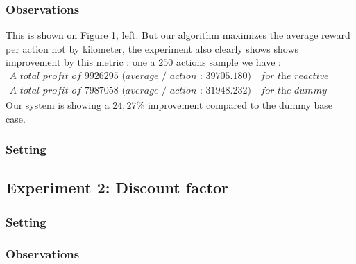 \documentclass[11pt]{article}
\begin{document}
\subsubsection{Observations}

 This is shown on Figure 1, left. But our algorithm maximizes the average reward per action not by kilometer, the experiment also clearly shows shows improvement by this metric : one a $250$ actions sample we have : 
 \begin{align*}
	 \textit{A total profit of $9926295$ (average / action : $39705.180$)} && \textit{for the reactive agent} \\
	 \textit{A total profit of $7987058$ (average / action : $31948.232$)} && \textit{for the dummy agent} 
 \end{align*}
 Our system is showing a $24,27\%$ improvement compared to the dummy base case.
 
 \subsubsection{Setting}
  

\subsection{Experiment 2: Discount factor}

\subsubsection{Setting}

\subsubsection{Observations}
\end{document}
